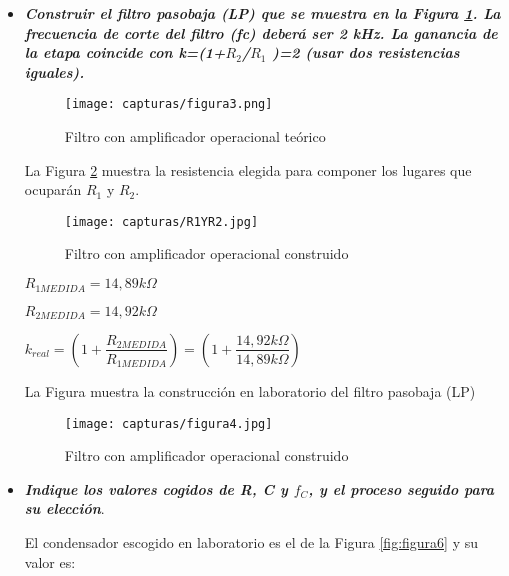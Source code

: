 \renewcommand{\labelitemi}{\ding{42}}
\begin{itemize}
	\item \textbf{\textit{Construir el filtro pasobaja (LP) que se muestra en la Figura \ref{fig:figura3}. La frecuencia de corte del filtro (fc)
	deberá ser 2 kHz.
	La ganancia de la etapa coincide con k=(1+$ R_{2} $/$ R_{1} $ )=2 (usar dos resistencias iguales).}}
	
		\begin{figure}[H] %
			\centering
			\texttt{[image: capturas/figura3.png]} 
			\caption{Filtro con amplificador operacional teórico}
			\label{fig:figura3}
		\end{figure}
	\vspace{-19pt}
		La Figura \ref{fig:figura5} muestra la resistencia elegida para componer los lugares que ocuparán $ R_{1} $ y $ R_{2} $.
		
		\begin{figure}[H] %
			\centering
			\texttt{[image: capturas/R1YR2.jpg]} 
			\caption{Filtro con amplificador operacional construido}
			\label{fig:figura5}
		\end{figure}
		
		$ R_{1MEDIDA} = 14,89 k\Omega $
		
		$ R_{2MEDIDA} = 14,92 k\Omega $ 
		
		$ k_{real} = (1 + \dfrac{R_{2MEDIDA}}{R_{1MEDIDA}}) = (1 + \dfrac{14,92 k\Omega}{14,89 k\Omega})$
		
		\begin{center}			
			{\fboxrule=1pt \fboxsep=6pt
				}
		\end{center}
	
		La Figura  muestra la construcción en laboratorio del filtro pasobaja (LP)
	
		\begin{figure}[H] %
			\centering
			\texttt{[image: capturas/figura4.jpg]} 
			\caption{Filtro con amplificador operacional construido}
			\label{fig:figura4}
		\end{figure}		

	\item \textbf{\textit{Indique los valores cogidos de R, C y $ f_{C} $, y el proceso seguido para su elección}}.
	
		El condensador escogido en laboratorio es el de la Figura \ref{fig:figura6} y su valor es:
		\begin{center}			
			{\fboxrule=1pt \fboxsep=6pt
				}
		\end{center}		
		

\end{itemize}
